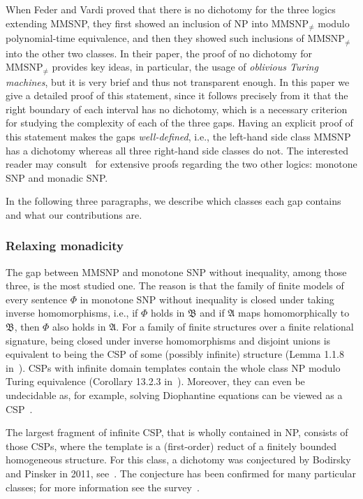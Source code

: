 \documentclass[10pt,a4paper]{amsart}
\theoremstyle{plain}
\theoremstyle{definition}
\numberwithin{equation}{section}
\newcommand{\structure}[1]{\mathfrak{#1}} %
\newcommand{\MMSNPineq}[0]{\ensuremath{\textrm{MMSNP}_{\not=}}}
\begin{document}
When Feder and Vardi proved that there is no dichotomy for the three logics extending MMSNP, they first showed an inclusion of NP into $\MMSNPineq$ modulo polynomial-time equivalence, and then they showed such inclusions of $\MMSNPineq$ into the other two classes.
%
In their paper, the proof of no dichotomy for $\MMSNPineq$ provides key ideas, in particular, the usage of \emph{oblivious Turing machines}, but it is very brief and thus not transparent enough.
%
In this paper we give a detailed proof of this statement, since it follows precisely from it that the right boundary of each interval has no dichotomy, which is a necessary criterion for studying the complexity of each of the three gaps.
%
Having an explicit proof of this statement makes the gaps \emph{well-defined}, i.e., the left-hand side class MMSNP has a dichotomy whereas all three right-hand side classes do not.
%
The interested reader may consult~\cite{barsukovphd} for extensive proofs regarding the two other logics: monotone SNP and monadic SNP.

In the following three paragraphs, we describe which classes each gap contains and what our contributions are.

\subsubsection*{Relaxing monadicity}

The gap between MMSNP and monotone SNP without inequality, among those three, is the most studied one.
%
The reason is that the family of finite models of every sentence $\Phi$ in monotone SNP without inequality is closed under taking inverse homomorphisms, i.e., if $\Phi$ holds in $\structure{B}$ and if $\structure{A}$ maps homomorphically to $\structure{B}$, then $\Phi$ also holds in $\structure{A}$.
%
For a family of finite structures over a finite relational signature, being closed under inverse homomorphisms and disjoint unions is equivalent to being the CSP of some (possibly infinite) structure (Lemma 1.1.8 in~\cite{bodirsky_book}).
%
CSPs with infinite domain templates contain the whole class NP modulo Turing equivalence (Corollary 13.2.3 in~\cite{bodirsky_book}).
%
Moreover, they can even be undecidable as, for example, solving Diophantine equations can be viewed as a CSP~\cite{matiyasevich}.

The largest fragment of infinite CSP, that is wholly contained in NP, consists of those CSPs, where the template is a (first-order) reduct of a finitely bounded homogeneous structure.
%
For this class, a dichotomy was conjectured by Bodirsky and Pinsker in 2011, see~\cite{bodirsky_pinsker_conjecture}.
%
The conjecture has been confirmed for many particular classes; for more information see the survey~\cite{pinsker_survey}.
\end{document}

